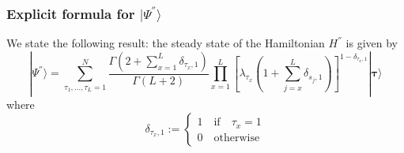 \documentclass[11pt]{article}
\numberwithin{equation}{section}
\numberwithin{equation}{subsection}
\begin{document}

\subsubsection{Explicit formula for $|\Psi^{''}\rangle$}\label{subsectionSSHsec}
We state the following result: the steady state of the Hamiltonian $H^{''}$ is given by 
\begin{equation}\label{ResulsBasis}
	|\Psi^{''} \rangle=\sum_{\tau_{1},\ldots,\tau_{L}=1}^{N}\frac{\Gamma\left(2+\sum_{x=1}^{L}\delta_{\tau_{x},1}\right)}{\Gamma\left(L+2\right)}\prod_{x=1}^{L}\left[\lambda_{\tau_{x}}\left(1+\sum_{j=x}^{L}\delta_{s_{j},1}\right)\right]^{1-\delta_{\tau_{x},1}}|\mathbf{\bm{\tau}}\rangle
\end{equation}
where 
\begin{equation}
    \delta_{\tau_{x},1}:=\begin{cases}
        1\quad \text{if}\quad \tau_{x}=1\\
        0\quad \text{otherwise}
    \end{cases}
\end{equation}
\end{document}
